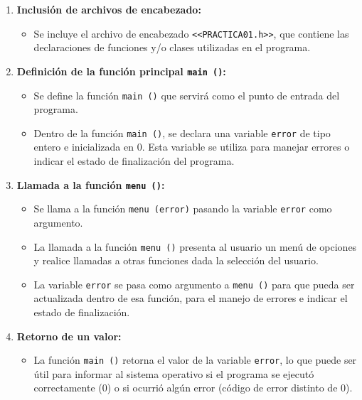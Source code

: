 \documentclass{article}
\begin{document}
            \begin{enumerate}
                \item \textbf{Inclusión de archivos de encabezado:}
                \begin{itemize}
                    \item Se incluye el archivo de encabezado \texttt{<<PRACTICA01.h>>}, que contiene las declaraciones
                    de funciones y/o clases utilizadas en el programa.
                \end{itemize}

                \item \textbf{Definición de la función principal \texttt{main ()}:}
                \begin{itemize}
                    \item Se define la función \texttt{main ()} que servirá como el punto de entrada del programa.
                    \item Dentro de la función \texttt{main ()}, se declara una variable \texttt{error} de tipo entero
                    e inicializada en 0. Esta variable se utiliza para manejar errores o indicar el estado de
                    finalización del programa.
                \end{itemize}

                \item \textbf{Llamada a la función \texttt{menu ()}:}
                \begin{itemize}
                    \item Se llama a la función \texttt{menu (error)} pasando la variable \texttt{error} como argumento.
                    \item La llamada a la función \texttt{menu ()} presenta al usuario un menú de opciones y realice llamadas a otras funciones
                    dada la selección del usuario.
                    \item La variable \texttt{error} se pasa como argumento a \texttt{menu ()} para que pueda ser
                    actualizada dentro de esa función, para el manejo de errores e indicar el estado de finalización.
                \end{itemize}

                \item \textbf{Retorno de un valor:}
                \begin{itemize}
                    \item La función \texttt{main ()} retorna el valor de la variable \texttt{error},
                    lo que puede ser útil para informar al sistema operativo si el programa se ejecutó correctamente (0) o si ocurrió algún
                    error (código de error distinto de 0).
                \end{itemize}
            \end{enumerate}
\end{document}
